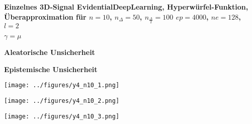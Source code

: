 \begin{otherlanguage}{ngerman}
\begin{samepage}
\begin{minipage}{\textwidth}
\end{minipage}
\end{samepage}




\begin{samepage}
\begin{minipage}{\textwidth}

\noindent\textbf{Einzelnes 3D-Signal \gls{EvidentialDeepLearning}, Hyperwürfel-Funktion,
Überapproximation für $n=10$, $n_{\Delta}=50$, $n_{\frac{\Delta}{2}}=100$ $ep=4000$, $ne=128$, $l=2$}


\begin{minipage}{0.05\textwidth}\vspace{0.5cm}\end{minipage}%
\begin{minipage}{0.3\textwidth}\centering \textbf{$\gamma=\mu$}\end{minipage}%
\begin{minipage}{0.3\textwidth}\centering \textbf{Aleatorische Unsicherheit}\end{minipage}%
\begin{minipage}{0.3\textwidth}\centering \textbf{Epistemische Unsicherheit}\end{minipage}

\vspace{0.125cm}

\begin{minipage}{0.05\textwidth}\centering{}\end{minipage}%
\begin{minipage}{0.3\textwidth}\centering\texttt{[image: ../figures/y4\_n10\_1.png]}\end{minipage}%
\begin{minipage}{0.3\textwidth}\centering\texttt{[image: ../figures/y4\_n10\_2.png]}\end{minipage}%
\begin{minipage}{0.3\textwidth}\centering\texttt{[image: ../figures/y4\_n10\_3.png]}\end{minipage}

\vspace{0.125cm}


\end{minipage}
\end{samepage}
\end{otherlanguage}
